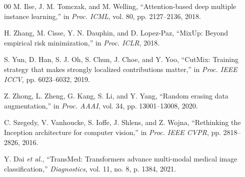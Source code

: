 \documentclass[conference]{IEEEtran}
\begin{document}
{\begin{thebibliography}{00}
M. Ilse, J. M. Tomczak, and M. Welling,
``Attention-based deep multiple instance learning,''
in \textit{Proc. ICML}, vol. 80, pp. 2127--2136, 2018.

H. Zhang, M. Cisse, Y. N. Dauphin, and D. Lopez-Paz,
``MixUp: Beyond empirical risk minimization,''
in \textit{Proc. ICLR}, 2018.

S. Yun, D. Han, S. J. Oh, S. Chun, J. Choe, and Y. Yoo,
``CutMix: Training strategy that makes strongly localized contributions matter,''
in \textit{Proc. IEEE ICCV}, pp. 6023--6032, 2019.

Z. Zhong, L. Zheng, G. Kang, S. Li, and Y. Yang,
``Random erasing data augmentation,''
in \textit{Proc. AAAI}, vol. 34, pp. 13001--13008, 2020.

C. Szegedy, V. Vanhoucke, S. Ioffe, J. Shlens, and Z. Wojna,
``Rethinking the Inception architecture for computer vision,''
in \textit{Proc. IEEE CVPR}, pp. 2818--2826, 2016.

Y. Dai \textit{et al.},
``TransMed: Transformers advance multi-modal medical image classification,''
\textit{Diagnostics}, vol. 11, no. 8, p. 1384, 2021.

\end{thebibliography}
} %
\end{document}
